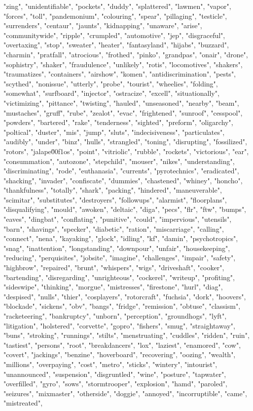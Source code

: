 "zing", "unidentifiable", "pockets", "duddy", "splattered", "lawmen", "vapor", "forces", "toll", "pandemonium", "colouring", "spear", "pillaging", "testicle", "surrenders", "centaur", "jaunts", "kidnapping", "unaware", "arise", "communitywide", "ripple", "crumpled", "automotive", "jep", "disgraceful", "overtaxing", "stop", "sweater", "heater", "fantasyland", "hijabs", "buzzard", "charmin", "pratfall", "atrocious", "frothed", "pinko", "grandpas", "onair", "drone", "sophistry", "shaker", "fraudulence", "unlikely", "rotis", "locomotives", "shakers", "traumatizes", "containers", "airshow", "komen", "antidiscrimination", "pests", "scythed", "nonissue", "utterly", "probe", "tourist", "wheelies", "folding", "somewhat", "surfboard", "injector", "ostracize", "excell", "situationally", "victimizing", "pittance", "twisting", "hauled", "unseasoned", "nearby", "beam", "mustaches", "gruff", "rube", "zealot", "evac", "frightened", "sunroof", "cesspool", "powders", "bartered", "rake", "tenderness", "sighted", "preform", "oligarchy", "poltical", "duster", "mis", "jump", "sluts", "indecisiveness", "particulates", "audibly", "under", "binz", "hulls", "strangled", "toning", "disrupting", "fossilized", "rotors", "jalape\u00f1os", "point", "vitriolic", "rubble", "rockets", "victorious", "ear", "consummation", "autozone", "stepchild", "mouser", "nikes", "understanding", "discriminating", "rode", "euthanasia", "currents", "pyrotechnics", "eradicated", "shacking", "invader", "confiscate", "dummies", "chastened", "whiney", "honcho", "thankfulness", "totally", "shark", "packing", "hindered", "maneuverable", "scimitar", "substitutes", "destroyers", "followups", "alarmist", "floorplans", "disqualifying", "mould", "awoken", "deltaic", "diga", "pecs", "flr", "ftw", "bumps", "eaves", "dingbat", "conflating", "punitive", "could", "impervious", "utensils", "barn", "shavings", "specker", "diabetic", "ration", "miscarriage", "calling", "connect", "nena", "kayaking", "glock", "idling", "kf", "damin", "psychotropics", "snag", "inattention", "longstanding", "downpour", "unfair", "housekeeping", "reducing", "perquisites", "jobsite", "imagine", "challenges", "impair", "safety", "highbrow", "repaired", "brunt", "whispers", "wigs", "driveshaft", "cooker", "bartending", "disregarding", "unrighteous", "cockerel", "writeup", "profiting", "sideswipe", "thinking", "morgue", "mistresses", "firestone", "hurl", "diag", "despised", "nulls", "thier", "cosplayers", "rotorcraft", "fuchsia", "dork", "hoovers", "blockade", "sickens", "obv", "bangs", "fridge", "remission", "obtuse", "classism", "racketeering", "bankruptcy", "unborn", "perception", "groundhogs", "lyft", "litigation", "holstered", "corvette", "gopro", "fishers", "smug", "straightaway", "buns", "stroking", "runnings", "stilts", "menstruating", "cuddles", "ridden", "ruin", "tastiest", "persons", "root", "breakdancers", "lox", "laziest", "enamored", "cow", "covert", "jackings", "benzine", "hoverboard", "recovering", "oozing", "wealth", "millions", "overpaying", "cost", "metro", "sticks", "wintery", "intourist", "unannounced", "suspension", "disgruntled", "wine", "posture", "tapwater", "overfilled", "gyro", "sows", "stormtrooper", "explosion", "hamd", "paroled", "seizures", "mixmaster", "otherside", "doggie", "annoyed", "incorruptible", "came", "mistreated", 